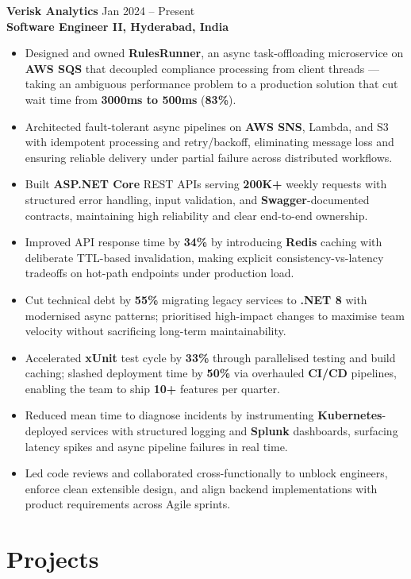 \documentclass[a4paper,10pt]{article}
\begin{document}
\textbf{Verisk Analytics} \hfill Jan 2024 -- Present \\
\textbf{Software Engineer II, Hyderabad, India}
\begin{itemize}[leftmargin=*]
    \item Designed and owned \textbf{RulesRunner}, an async task-offloading microservice on \textbf{AWS SQS} that decoupled compliance processing from client threads — taking an ambiguous performance problem to a production solution that cut wait time from \textbf{3000ms to 500ms} (\textbf{83\%}).
    \item Architected fault-tolerant async pipelines on \textbf{AWS SNS}, Lambda, and S3 with idempotent processing and retry/backoff, eliminating message loss and ensuring reliable delivery under partial failure across distributed workflows.
    \item Built \textbf{ASP.NET Core} REST APIs serving \textbf{200K+} weekly requests with structured error handling, input validation, and \textbf{Swagger}-documented contracts, maintaining high reliability and clear end-to-end ownership.
    \item Improved API response time by \textbf{34\%} by introducing \textbf{Redis} caching with deliberate TTL-based invalidation, making explicit consistency-vs-latency tradeoffs on hot-path endpoints under production load.
    \item Cut technical debt by \textbf{55\%} migrating legacy services to \textbf{.NET 8} with modernised async patterns; prioritised high-impact changes to maximise team velocity without sacrificing long-term maintainability.
    \item Accelerated \textbf{xUnit} test cycle by \textbf{33\%} through parallelised testing and build caching; slashed deployment time by \textbf{50\%} via overhauled \textbf{CI/CD} pipelines, enabling the team to ship \textbf{10+} features per quarter.
    \item Reduced mean time to diagnose incidents by instrumenting \textbf{Kubernetes}-deployed services with structured logging and \textbf{Splunk} dashboards, surfacing latency spikes and async pipeline failures in real time.
    \item Led code reviews and collaborated cross-functionally to unblock engineers, enforce clean extensible design, and align backend implementations with product requirements across Agile sprints.
\end{itemize}

\section*{Projects}
\end{document}
